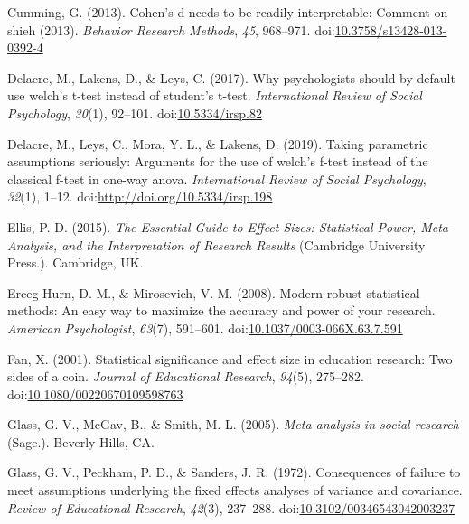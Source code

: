 \documentclass[
  man,floatsintext]{apa6}
\begin{document}
\leavevmode\hypertarget{ref-Cumming_2013}{}%
Cumming, G. (2013). Cohen's d needs to be readily interpretable: Comment on shieh (2013). \emph{Behavior Research Methods}, \emph{45}, 968--971. doi:\href{https://doi.org/10.3758/s13428-013-0392-4}{10.3758/s13428-013-0392-4}

\leavevmode\hypertarget{ref-Delacre_et_al_2017}{}%
Delacre, M., Lakens, D., \& Leys, C. (2017). Why psychologists should by default use welch's t-test instead of student's t-test. \emph{International Review of Social Psychology}, \emph{30}(1), 92--101. doi:\href{https://doi.org/10.5334/irsp.82}{10.5334/irsp.82}

\leavevmode\hypertarget{ref-Delacre_et_al_2019}{}%
Delacre, M., Leys, C., Mora, Y. L., \& Lakens, D. (2019). Taking parametric assumptions seriously: Arguments for the use of welch's f-test instead of the classical f-test in one-way anova. \emph{International Review of Social Psychology}, \emph{32}(1), 1--12. doi:\href{https://doi.org/http://doi.org/10.5334/irsp.198}{http://doi.org/10.5334/irsp.198}

\leavevmode\hypertarget{ref-Ellis_2015}{}%
Ellis, P. D. (2015). \emph{The Essential Guide to Effect Sizes: Statistical Power, Meta-Analysis, and the Interpretation of Research Results} (Cambridge University Press.). Cambridge, UK.

\leavevmode\hypertarget{ref-Erceg-Hurn_Mirosevich_2008}{}%
Erceg-Hurn, D. M., \& Mirosevich, V. M. (2008). Modern robust statistical methods: An easy way to maximize the accuracy and power of your research. \emph{American Psychologist}, \emph{63}(7), 591--601. doi:\href{https://doi.org/10.1037/0003-066X.63.7.591}{10.1037/0003-066X.63.7.591}

\leavevmode\hypertarget{ref-Fan_2001}{}%
Fan, X. (2001). Statistical significance and effect size in education research: Two sides of a coin. \emph{Journal of Educational Research}, \emph{94}(5), 275--282. doi:\href{https://doi.org/10.1080/00220670109598763}{10.1080/00220670109598763}

\leavevmode\hypertarget{ref-Glass_et_al_1981}{}%
Glass, G. V., McGav, B., \& Smith, M. L. (2005). \emph{Meta-analysis in social research} (Sage.). Beverly Hills, CA.

\leavevmode\hypertarget{ref-Glass_et_al_1972}{}%
Glass, G. V., Peckham, P. D., \& Sanders, J. R. (1972). Consequences of failure to meet assumptions underlying the fixed effects analyses of variance and covariance. \emph{Review of Educational Research}, \emph{42}(3), 237--288. doi:\href{https://doi.org/10.3102/00346543042003237}{10.3102/00346543042003237}
\end{document}
